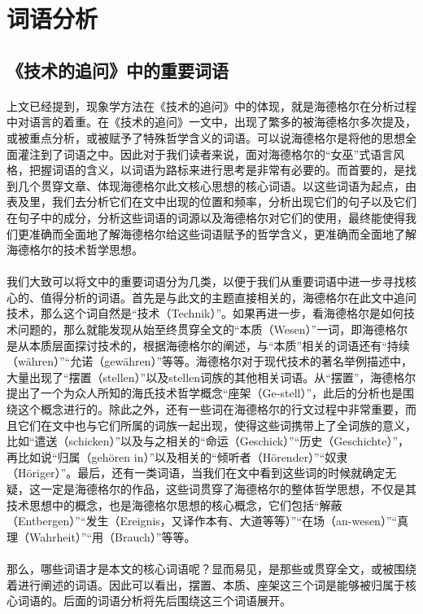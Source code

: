 \documentclass{article}
\begin{document}
\section{词语分析}
	\subsection{《技术的追问》中的重要词语}
		\paragraph{}
		上文已经提到，现象学方法在《技术的追问》中的体现，就是海德格尔在分析过程中对语言的着重。在《技术的追问》一文中，出现了繁多的被海德格尔多次提及，或被重点分析，或被赋予了特殊哲学含义的词语。可以说海德格尔是将他的思想全面灌注到了词语之中。因此对于我们读者来说，面对海德格尔的“女巫”式语言风格，把握词语的含义，以词语为路标来进行思考是非常有必要的。而首要的，是找到几个贯穿文章、体现海德格尔此文核心思想的核心词语。以这些词语为起点，由表及里，我们去分析它们在文中出现的位置和频率，分析出现它们的句子以及它们在句子中的成分，分析这些词语的词源以及海德格尔对它们的使用，最终能使得我们更准确而全面地了解海德格尔给这些词语赋予的哲学含义，更准确而全面地了解海德格尔的技术哲学思想。
		\paragraph{}
		我们大致可以将文中的重要词语分为几类，以便于我们从重要词语中进一步寻找核心的、值得分析的词语。首先是与此文的主题直接相关的，海德格尔在此文中追问技术，那么这个词自然是“技术（Technik）”。如果再进一步，看海德格尔是如何技术问题的，那么就能发现从始至终贯穿全文的“本质（Wesen）”一词，即海德格尔是从本质层面探讨技术的，根据海德格尔的阐述，与“本质”相关的词语还有“持续（währen）”“允诺（gewähren）”等等。海德格尔对于现代技术的著名举例描述中，大量出现了“摆置（stellen）”以及stellen词族的其他相关词语。从“摆置”，海德格尔提出了一个为众人所知的海氏技术哲学概念“座架（Ge-stell）”，此后的分析也是围绕这个概念进行的。除此之外，还有一些词在海德格尔的行文过程中非常重要，而且它们在文中也与它们所属的词族一起出现，使得这些词携带上了全词族的意义，比如“遣送（schicken）”以及与之相关的“命运（Geschick）”“历史（Geschichte）”，再比如说“归属（gehören in）”以及相关的“倾听者（Hörender）”“奴隶（Höriger）”。最后，还有一类词语，当我们在文中看到这些词的时候就确定无疑，这一定是海德格尔的作品，这些词贯穿了海德格尔的整体哲学思想，不仅是其技术思想中的概念，也是海德格尔思想的核心概念，它们包括“解蔽（Entbergen）”“发生（Ereignis，又译作本有、大道等等）”“在场（an-wesen）”“真理（Wahrheit）”“用（Brauch）”等等。
		\paragraph{}
		那么，哪些词语才是本文的核心词语呢？显而易见，是那些或贯穿全文，或被围绕着进行阐述的词语。因此可以看出，摆置、本质、座架这三个词是能够被归属于核心词语的。后面的词语分析将先后围绕这三个词语展开。
\end{document}
